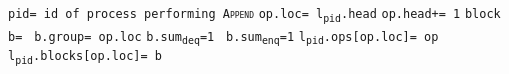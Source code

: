 \documentclass[10pt]{article}
\theoremstyle{definition}
\begin{document}
\begin{algorithm}
\begin{algorithmic}[1]
\begin{multicols}{2}
\Statex

\State \texttt{pid= id of process performing \textsc{Append}}
\State \texttt{op.loc= l\textsubscript{pid}.head}
\State \texttt{op.head+= 1}
\State \texttt{block b= }
\State \texttt{b.group= op.loc}
\texttt{b.sum\textsubscript{deq}=1} \Else \texttt{~b.sum\textsubscript{enq}=1} \EndIf
\State \texttt{l\textsubscript{pid}.ops[op.loc]= op} \label{addOP}
\State \texttt{l\textsubscript{pid}.blocks[op.loc]= b}
\State {} 

\end{multicols}
\end{algorithmic}
\end{algorithm}
\end{document}
